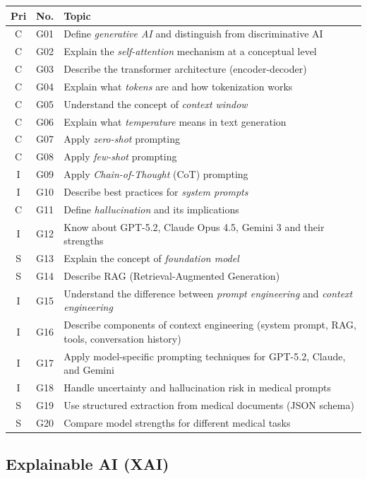 \documentclass[11pt,a4paper]{article}
\begin{document}
\begin{longtable}{@{}clp{9cm}@{}}
\toprule
\textbf{Pri} & \textbf{No.} & \textbf{Topic} \\
\midrule
\endfirsthead
\midrule
\endhead
\midrule
\endfoot
\bottomrule
\endlastfoot
C & G01 & Define \emph{generative AI} and distinguish from discriminative AI \\
C & G02 & Explain the \emph{self-attention} mechanism at a conceptual level \\
C & G03 & Describe the transformer architecture (encoder-decoder) \\
C & G04 & Explain what \emph{tokens} are and how tokenization works \\
C & G05 & Understand the concept of \emph{context window} \\
C & G06 & Explain what \emph{temperature} means in text generation \\
C & G07 & Apply \emph{zero-shot} prompting \\
C & G08 & Apply \emph{few-shot} prompting \\
I & G09 & Apply \emph{Chain-of-Thought} (CoT) prompting \\
I & G10 & Describe best practices for \emph{system prompts} \\
C & G11 & Define \emph{hallucination} and its implications \\
I & G12 & Know about GPT-5.2, Claude Opus 4.5, Gemini 3 and their strengths \\
S & G13 & Explain the concept of \emph{foundation model} \\
S & G14 & Describe RAG (Retrieval-Augmented Generation) \\
I & G15 & Understand the difference between \emph{prompt engineering} and \emph{context engineering} \\
I & G16 & Describe components of context engineering (system prompt, RAG, tools, conversation history) \\
I & G17 & Apply model-specific prompting techniques for GPT-5.2, Claude, and Gemini \\
I & G18 & Handle uncertainty and hallucination risk in medical prompts \\
S & G19 & Use structured extraction from medical documents (JSON schema) \\
S & G20 & Compare model strengths for different medical tasks \\
\end{longtable}

\subsection{Explainable AI (XAI)}
\end{document}
